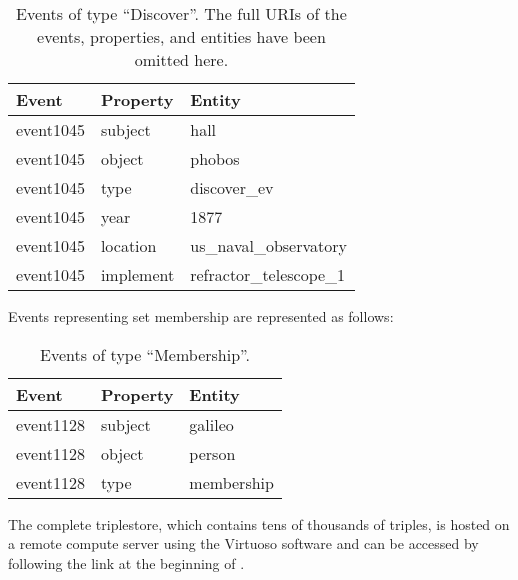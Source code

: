 \documentclass[../main.tex]{subfiles}
\begin{document}
\begin{refsection}
\begin{table}[h]
	\caption[Events of type ``Discover''.]{Events of type ``Discover''. The full URIs of the events, properties, and entities have been omitted here.}
    \vspace{0.2em}
	\label{webist2019conf:evdiscover}
	\centering
	\begin{tabular}{lll}
		\toprule
		Event & Property & Entity \\
		\midrule
		event1045 &
		subject &
		hall \\

		event1045 &
		object &
		phobos \\

		event1045 &
		type &
		discover\_ev \\

		event1045 &
		year &
		1877 \\

		event1045 &
		location &
		us\_naval\_observatory \\

		event1045 &
		implement &
		refractor\_telescope\_1 \\
		\bottomrule
	\end{tabular}
\end{table}

Events representing set membership are represented as follows:

\begin{table}[h]
	\caption{Events of type ``Membership''.}
	\label{webist2019conf:evmember}
	\centering
	\begin{tabular}{lll}
		\toprule
		Event & Property & Entity \\
		\midrule
		event1128 &
		subject &
		galileo \\

		event1128 &
		object &
		person \\

		event1128 &
		type &
		membership \\
		\bottomrule
	\end{tabular}
\end{table}

The complete triplestore, which contains tens of thousands of triples,  is hosted on a remote compute server using the Virtuoso software \cite{virtuoso} and can be accessed by following the link at the beginning of .


\end{refsection}
\end{document}
